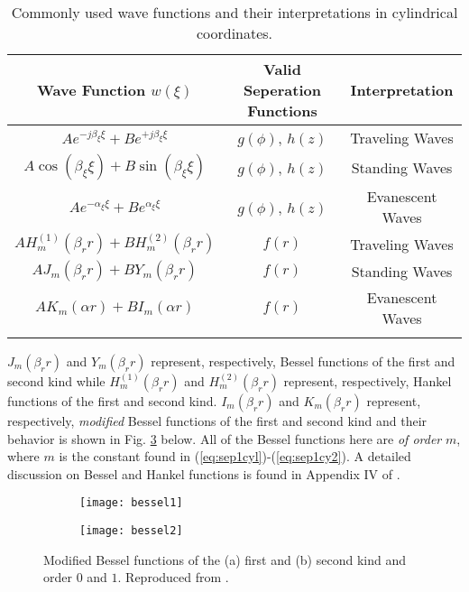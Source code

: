 \begin{table}[h]
	\renewcommand*{\arraystretch}{1.4}
	\centering
	\caption{Commonly used wave functions and their interpretations in cylindrical coordinates.}
	\label{tab:cylWaves}
	\begin{tabular}{c c c}
		\toprule
		\addlinespace[2pt] %
		\toprule
		Wave Function $w(\xi)$ & Valid Seperation Functions & Interpretation \\
		\toprule 
		\addlinespace[5pt]
		$Ae^{-j\beta_{\xi}\xi} + Be^{+j\beta_{\xi}\xi}$ & $g(\phi)$, $h(z)$ & Traveling Waves \\
		$A\cos(\beta_{\xi}\xi) + B\sin(\beta_{\xi}\xi)$ & $g(\phi)$, $h(z)$ & Standing Waves \\
		$Ae^{-\alpha_{\xi}\xi} + Be^{\alpha_{\xi}\xi}$ & $g(\phi)$, $h(z)$ & Evanescent Waves \\			
		$AH_{m}^{(1)}(\beta_r r) + BH_{m}^{(2)}(\beta_r r)$ & $f(r)$ & Traveling Waves \\
		$AJ_{m}(\beta_r r) + BY_{m}(\beta_r r)$ & $f(r)$ & Standing Waves \\
		$AK_{m}(\alpha r) + BI_{m}(\alpha r)$ & $f(r)$ & Evanescent Waves \\			
		\bottomrule
		\addlinespace[1pt] %
		\bottomrule
	\end{tabular}
\end{table}

$J_{m}(\beta_r r)$ and $Y_{m}(\beta_r r)$ represent, respectively, Bessel functions of the first and second kind while $H_{m}^{(1)}(\beta_r r)$ and $H_{m}^{(2)}(\beta_r r)$ represent, respectively, Hankel functions of the first and second kind. $I_{m}(\beta_r r)$ and $K_{m}(\beta_r r)$ represent, respectively, \textit{modified} Bessel functions of the first and second kind and their behavior is shown in Fig. \ref{fig:bessel} below. All of the Bessel functions here are \textit{of order} $m$, where $m$ is the constant found in (\ref{eq:sep1cyl})-(\ref{eq:sep1cy2}). A detailed discussion on Bessel and Hankel functions is found in Appendix IV of \cite{balanis1}.

\begin{figure}[]
	\centering
	\begin{subfigure}[t]{0.49\textwidth}
		\centering
		\texttt{[image: bessel1]}
		\caption{}
		\label{fig:bessel1}
	\end{subfigure}
	\hfill
	\begin{subfigure}[t]{0.49\textwidth}
		\centering
		\texttt{[image: bessel2]}
		\caption{}
		\label{fig:bessel2}
	\end{subfigure}
	\caption{Modified Bessel functions of the (a) first and (b) second kind and order $0$ and $1$. Reproduced from \cite{balanis1}.}
	\label{fig:bessel}
\end{figure}


